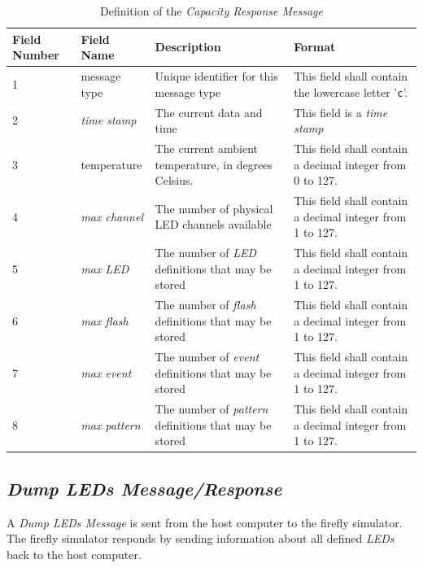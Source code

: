 \documentclass[letterpaper,11pt]{article}
\begin{document}
\begin{table}[H]
  \caption{Definition of the \textit{Capacity Response Message}}
  \centering
  \setlength\extrarowheight{2pt}
  \begin{tabular}[h]{|p{0.5in}|p{1.00in}|p{2.25in}|p{2.25in}|} \hline
    Field Number & Field Name & Description & Format \\ \hline
    1            & message type
    & Unique identifier for this message type
    & This field shall contain the lowercase letter '\texttt{c}'.
    \\ \hline
    2            & \textit{time stamp}
    & The current data and time
    & This field is a \textit{time stamp}
    \\ \hline
    3            & temperature
    & The current ambient temperature, in degrees Celsius.
    & This field shall contain a decimal integer from 0 to 127.
    \\ \hline
    4            & \textit{max channel}
    & The number of physical LED channels available
    & This field shall contain a decimal integer from 1 to 127.
    \\ \hline
    5            & \textit{max LED}
    & The number of \textit{LED} definitions that may be stored
    & This field shall contain a decimal integer from 1 to 127.
    \\ \hline
    6            & \textit{max flash}
    & The number of \textit{flash} definitions that may be stored
    & This field shall contain a decimal integer from 1 to 127.
    \\ \hline
    7            & \textit{max event}
    & The number of \textit{event} definitions that may be stored
    & This field shall contain a decimal integer from 1 to 127.
    \\ \hline
    8            & \textit{max pattern}
    & The number of \textit{pattern} definitions that may be stored
    & This field shall contain a decimal integer from 1 to 127.
    \\ \hline
  \end{tabular}
  \label{tab:CapacityResponse}
\end{table}

\subsection{\textit{Dump LEDs Message/Response}}

A \textit{Dump LEDs Message} is sent from the host computer to the
firefly simulator. The firefly simulator responds by sending information
about all defined \textit{LEDs} back to the host computer.
\end{document}

